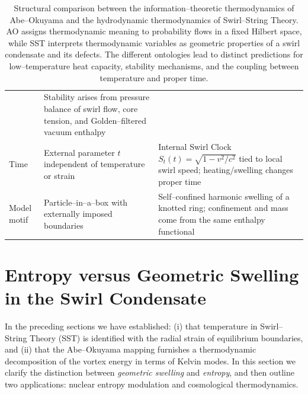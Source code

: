 \documentclass[11pt]{article}
\begin{document}
\begin{table}[t]
\begin{tabular}{p{3cm}p{5.4cm}p{5.4cm}}
                    & Stability arises from pressure balance of swirl flow, core tension, and Golden--filtered vacuum enthalpy \\
                    Time
                    & External parameter $t$ independent of temperature or strain
                    & Internal Swirl Clock $S_t(t) = \sqrt{1 - v^2/c^2}$ tied to local swirl speed; heating/swelling changes proper time \\
                    Model motif
                    & Particle--in--a--box with externally imposed boundaries
                    & Self--confined harmonic swelling of a knotted ring; confinement and mass come from the same enthalpy functional \\
                    \hline
                \end{tabular}
                \caption{Structural comparison between the information--theoretic
                thermodynamics of Abe--Okuyama and the hydrodynamic
                thermodynamics of Swirl--String Theory. AO assigns thermodynamic
                meaning to probability flows in a fixed Hilbert space, while SST
                interprets thermodynamic variables as geometric properties of a
                swirl condensate and its defects. The different ontologies lead to
                distinct predictions for low--temperature heat capacity, stability
                mechanisms, and the coupling between temperature and proper time.}
                \label{tab:AO-SST-summary}
            \end{table}

    \section{Entropy versus Geometric Swelling in the Swirl Condensate}
        \label{sec:entropy-vs-swelling}

        In the preceding sections we have established:
        (i) that temperature in Swirl--String Theory (SST) is identified with the
        radial strain of equilibrium boundaries, and
        (ii) that the Abe--Okuyama mapping furnishes a thermodynamic
        decomposition of the vortex energy in terms of Kelvin modes.
        In this section we clarify the distinction between \emph{geometric
    swelling} and \emph{entropy}, and then outline two applications:
        nuclear entropy modulation and cosmological thermodynamics.
\end{document}
